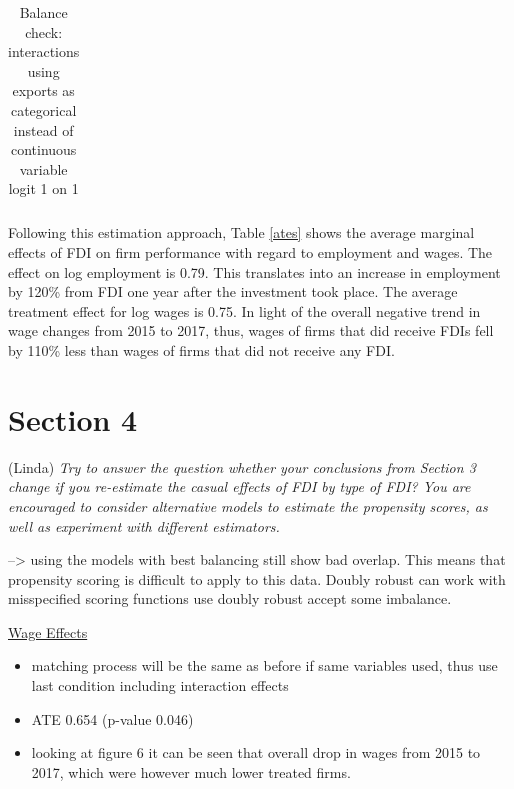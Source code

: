 \documentclass[11pt,a4paper,leqno]{article}
\begin{document}
\begin{table}
	\centering
	\begin{tabular}{lcccc}
	
	\end{tabular}
	\caption{Balance check: interactions using exports as categorical instead of continuous variable logit 1 on 1}
	\label{bal_intcatlog1}
\end{table}

 Following this estimation approach, Table \ref{ates} shows the average marginal effects of FDI on firm performance with regard to employment and wages. The effect on log employment is 0.79. This translates into an increase in employment by 120\% from FDI one year after the investment took place. The average treatment effect for log wages is 0.75. In light of the overall negative trend in wage changes from 2015 to 2017, thus, wages of firms that did receive FDIs fell by 110\% less than wages of firms that did not receive any FDI.




\clearpage

\section*{Section 4} (Linda)
\textit{Try to answer the question whether your conclusions from Section 3 change if you re-estimate the casual effects of FDI by type of FDI? You are encouraged to consider alternative models to estimate the propensity scores, as well as experiment with different estimators.}


--> using the models with best balancing still show bad overlap. This means that propensity scoring is difficult to apply to this data. Doubly robust can work with misspecified scoring functions use doubly robust accept some imbalance. 

\underline{Wage Effects}
\begin{itemize}
	\item matching process will be the same as before if same variables used, thus use last condition including interaction effects
	\item ATE 0.654 (p-value 0.046)
	\item looking at figure 6 it can be seen that overall drop in wages from 2015 to 2017, which were however much lower treated firms.
\end{itemize}
\end{document}
